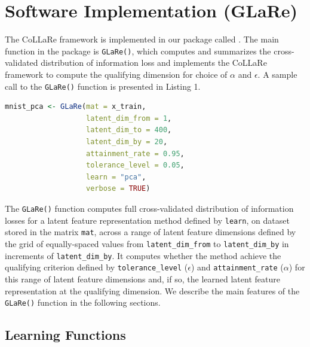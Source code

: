 \section{Software Implementation (GLaRe)}\label{sec:software}


The CoLLaRe framework is implemented in our  package called .
The main function in the  package is \texttt{GLaRe()}, which computes and summarizes the cross-validated distribution of information loss and implements the CoLLaRe framework to compute the qualifying dimension for choice of $\alpha$ and $\epsilon$.
A sample call to the \texttt{GLaRe()} function is presented in Listing 1.

\begin{lstlisting}[language=R, caption={Example call to the \texttt{GLaRe()} function.}]
mnist_pca <- GLaRe(mat = x_train,
                   latent_dim_from = 1,
                   latent_dim_to = 400,
                   latent_dim_by = 20,
                   attainment_rate = 0.95,
                   tolerance_level = 0.05,
                   learn = "pca",
                   verbose = TRUE)
\end{lstlisting}
The \texttt{GLaRe()} function computes full cross-validated distribution of information losses for a latent feature representation method defined by \texttt{learn}, on dataset stored in the matrix \texttt{mat}, across a range of latent feature dimensions defined by the grid of equally-spaced values from \texttt{latent\_dim\_from} to \texttt{latent\_dim\_by} in increments of \texttt{latent\_dim\_by}.
It computes whether the method achieve the qualifying criterion defined by \texttt{tolerance\_level} ($\epsilon$) and \texttt{attainment\_rate} ($\alpha$) for this range of latent feature dimensions and, if so, the learned latent feature representation at the qualifying dimension.
We describe the main features of the \texttt{GLaRe()} function in the following sections.

\subsection{Learning Functions}\label{sec:learning-functions}

